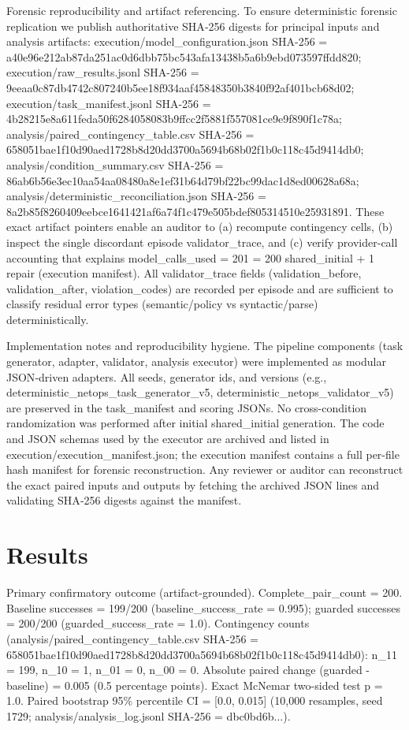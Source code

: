 \documentclass[conference]{IEEEtran}
\begin{document}
Forensic reproducibility and artifact referencing. To ensure deterministic forensic replication we publish authoritative SHA‑256 digests for principal inputs and analysis artifacts: execution/model\_configuration.json SHA-256 = a40e96e212ab87da251ac0d6dbb75bc543afa13438b5a6b9ebd073597ffdd820; execution/raw\_results.jsonl SHA-256 = 9eeaa0c87db4742c807240b5ee18f934aaf45848350b3840f92af401bcb68d02; execution/task\_manifest.jsonl SHA-256 = 4b28215e8a611feda50f6284058083b9ffcc2f5881f557081ce9e9f890f1c78a; analysis/paired\_contingency\_table.csv SHA-256 = 658051bae1f10d90aed1728b8d20dd3700a5694b68b02f1b0c118c45d9414db0; analysis/condition\_summary.csv SHA-256 = 86ab6b56e3ec10aa54aa08480a8e1ef31b64d79bf22bc99dac1d8ed00628a68a; analysis/deterministic\_reconciliation.json SHA-256 = 8a2b85f8260409eebce1641421af6a74f1c479e505bdef805314510e25931891. These exact artifact pointers enable an auditor to (a) recompute contingency cells, (b) inspect the single discordant episode validator\_trace, and (c) verify provider-call accounting that explains model\_calls\_used = 201 = 200 shared\_initial + 1 repair (execution manifest). All validator\_trace fields (validation\_before, validation\_after, violation\_codes) are recorded per episode and are sufficient to classify residual error types (semantic/policy vs syntactic/parse) deterministically.

Implementation notes and reproducibility hygiene. The pipeline components (task generator, adapter, validator, analysis executor) were implemented as modular JSON‑driven adapters. All seeds, generator ids, and versions (e.g., deterministic\_netops\_task\_generator\_v5, deterministic\_netops\_validator\_v5) are preserved in the task\_manifest and scoring JSONs. No cross-condition randomization was performed after initial shared\_initial generation. The code and JSON schemas used by the executor are archived and listed in execution/execution\_manifest.json; the execution manifest contains a full per-file hash manifest for forensic reconstruction. Any reviewer or auditor can reconstruct the exact paired inputs and outputs by fetching the archived JSON lines and validating SHA‑256 digests against the manifest.

\section{Results}
Primary confirmatory outcome (artifact-grounded). Complete\_pair\_count = 200. Baseline successes = 199/200 (baseline\_success\_rate = 0.995); guarded successes = 200/200 (guarded\_success\_rate = 1.0). Contingency counts (analysis/paired\_contingency\_table.csv SHA-256 = 658051bae1f10d90aed1728b8d20dd3700a5694b68b02f1b0c118c45d9414db0): n\_11 = 199, n\_10 = 1, n\_01 = 0, n\_00 = 0. Absolute paired change (guarded - baseline) = 0.005 (0.5 percentage points). Exact McNemar two-sided test p = 1.0. Paired bootstrap 95\% percentile CI = [0.0, 0.015] (10,000 resamples, seed 1729; analysis/analysis\_log.jsonl SHA-256 = dbc0bd6b...).
\end{document}

